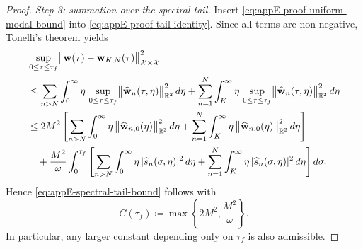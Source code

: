 \begin{proof}
    \smallskip
    \noindent
    \textit{Step 3: summation over the spectral tail.}
    Insert \eqref{eq:appE-proof-uniform-modal-bound} into
    \eqref{eq:appE-proof-tail-identity}. Since all terms are non-negative, Tonelli's theorem yields
    \begin{align}
         & \sup_{0\le \tau\le \tau_f}
        \bigl\|\mathbf w(\tau)-\mathbf w_{K,N}(\tau)\bigr\|_{\mathcal X\times\mathcal X}^2
        \notag                        \\
         & \le
        \sum_{n>N}\int_0^\infty
        \eta\,
        \sup_{0\le \tau\le \tau_f}
        \bigl\|\widehat{\mathbf w}_n(\tau,\eta)\bigr\|_{\mathbb R^2}^2
        \, d\eta
        +
        \sum_{n=1}^{N}\int_K^\infty
        \eta\,
        \sup_{0\le \tau\le \tau_f}
        \bigl\|\widehat{\mathbf w}_n(\tau,\eta)\bigr\|_{\mathbb R^2}^2
        \, d\eta
        \notag                        \\
         & \le
        2M^2
        \left[
        \sum_{n>N}\int_0^\infty
        \eta\,\bigl\|\widehat{\mathbf w}_{n,0}(\eta)\bigr\|_{\mathbb R^2}^2\, d\eta
        +
        \sum_{n=1}^{N}\int_K^\infty
        \eta\,\bigl\|\widehat{\mathbf w}_{n,0}(\eta)\bigr\|_{\mathbb R^2}^2\, d\eta
        \right]
        \notag                        \\
         & \quad
        +
        \frac{M^2}{\omega}
        \int_0^{\tau_f}
        \left[
            \sum_{n>N}\int_0^\infty
            \eta\, |\widehat s_n(\sigma,\eta)|^2\, d\eta
            +
            \sum_{n=1}^{N}\int_K^\infty
            \eta\, |\widehat s_n(\sigma,\eta)|^2\, d\eta
            \right] d\sigma.
        \label{eq:appE-proof-tail-estimate}
    \end{align}
    Hence \eqref{eq:appE-spectral-tail-bound} follows with
    \[
        C(\tau_f)\coloneqq \max\!\left\{2M^2,\frac{M^2}{\omega}\right\}.
    \]
    In particular, any larger constant depending only on \(\tau_f\) is also
    admissible.


\end{proof}
